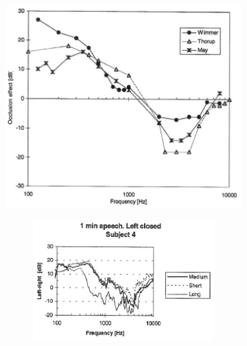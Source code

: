 \documentclass[dissertation,copyright]{uathesis}
\begin{document}
\begin{figure}
\begin{subfigure}{0.5\textwidth}
  \includegraphics[width=1\textwidth]{figure/hansenAverageOE.png}
  \caption{ }
  \label{hansenAverageOEa}
\end{subfigure}%
\hfill
\begin{subfigure}{0.5\textwidth}
  \begin{subfigure}{1\textwidth}
    \includegraphics[width=1\textwidth]{figure/Hansen_OE-plot_a.png}
  \end{subfigure}
  \begin{subfigure}{1\textwidth}

\end{subfigure}
\end{subfigure}
\end{figure}
\end{document}
